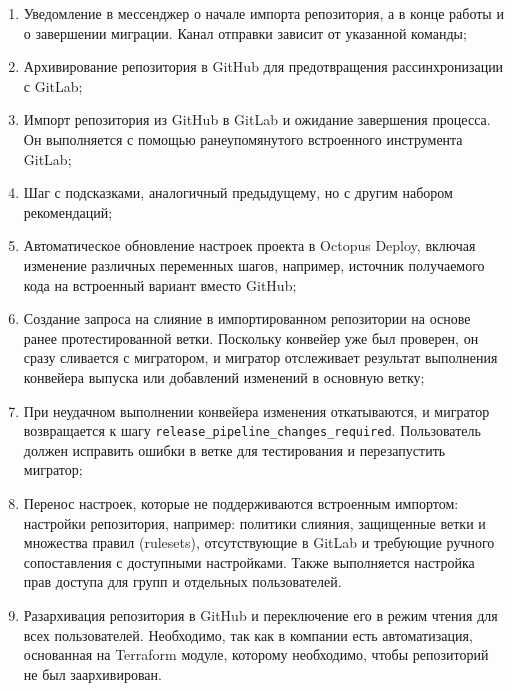 \begin{enumerate}
  \item Уведомление в мессенджер о начале импорта репозитория, а в конце работы и о завершении миграции.
        Канал отправки зависит от указанной команды;
  \item Архивирование репозитория в GitHub для предотвращения рассинхронизации с GitLab;
  \item Импорт репозитория из GitHub в GitLab и ожидание завершения процесса.
        Он выполняется с помощью ранеупомянутого встроенного инструмента GitLab;
  \item Шаг с подсказками, аналогичный предыдущему, но с другим набором рекомендаций;
  \item Автоматическое обновление настроек проекта в Octopus Deploy, включая изменение различных переменных шагов, например, источник получаемого кода на встроенный вариант вместо GitHub;
  \item Создание запроса на слияние в импортированном репозитории на основе ранее протестированной ветки.
        Поскольку конвейер уже был проверен, он сразу сливается с мигратором, и мигратор отслеживает результат выполнения конвейера выпуска или добавлений изменений в основную ветку;
  \item При неудачном выполнении конвейера изменения откатываются, и мигратор возвращается к шагу \texttt{release\_pipeline\_changes\_required}.
        Пользователь должен исправить ошибки в ветке для тестирования и перезапустить мигратор;
  \item Перенос настроек, которые не поддерживаются встроенным импортом: настройки репозитория, например: политики слияния, защищенные ветки и множества правил (rulesets), отсутствующие в GitLab и требующие ручного сопоставления с доступными настройками.
        Также выполняется настройка прав доступа для групп и отдельных пользователей.
  \item Разархивация репозитория в GitHub и переключение его в режим чтения для всех пользователей.
        Необходимо, так как в компании есть автоматизация, основанная на Terraform модуле, которому необходимо, чтобы репозиторий не был заархивирован.
\end{enumerate}

